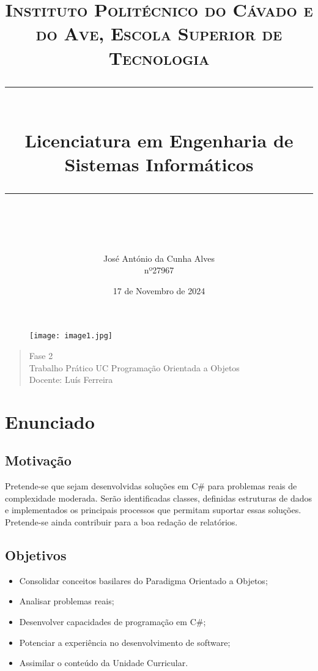 \documentclass[11pt]{scrartcl} %
\title{	
	\normalfont\normalsize
	\textsc{Instituto Politécnico do Cávado e do Ave, Escola Superior de Tecnologia}\\ %
	\vspace{25pt} %
	\rule{\linewidth}{0.5pt}\\ %
	\vspace{20pt} %
	{\huge Licenciatura em Engenharia de Sistemas Informáticos }\\ %
	\vspace{12pt} %
	\rule{\linewidth}{2pt}\\ %
	\vspace{12pt} %
}
\author{\LARGE José António da Cunha Alves \\ nº27967} %
\date{\normalsize 17 de Novembro de 2024} %
\begin{document}
\maketitle %


\begin{figure}[h] %
	\centering
	\texttt{[image: image1.jpg]} %
\end{figure}

\begin{quote}
	\begin{center}
		Fase 2\\
		\vspace{12pt}
		Trabalho Prático UC Programação Orientada a Objetos\\
		\vspace{12pt}
		Docente: Luís Ferreira
	\end{center}	
\end{quote}
\newpage

\renewcommand{\contentsname}{Conteúdos}
\tableofcontents

\renewcommand\lstlistingname{Amostra de Código}
\renewcommand\lstlistlistingname{Amostras de Código}
\lstlistoflistings

\newpage

\section{Enunciado}
\subsection{Motivação}

Pretende-se que sejam desenvolvidas soluções em C\# para problemas reais de complexidade moderada. Serão identificadas classes, definidas estruturas de dados e implementados os principais processos que permitam suportar essas soluções. Pretende-se ainda contribuir para a boa redação de relatórios.

\subsection{Objetivos}
\begin{itemize}
	\item Consolidar conceitos basilares do Paradigma Orientado a Objetos; 
	\item Analisar problemas reais;
	\item Desenvolver capacidades de programação em C\#;
	\item Potenciar a experiência no desenvolvimento de software;
	\item Assimilar o conteúdo da Unidade Curricular.
\end{itemize}
\end{document}
